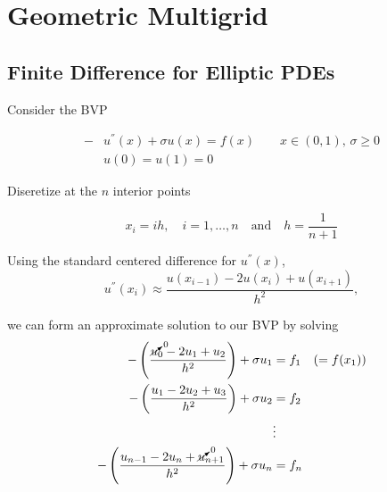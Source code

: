 \section{Geometric Multigrid}

\subsection{Finite Difference for Elliptic PDEs}

Consider the BVP

\begin{align*}
-&u^{''}(x) + \sigma u(x) = f(x) \qquad x\in (0,1),\, \sigma \geq 0 \\
 &u(0)=u(1)=0
\end{align*}

Diseretize at the $n$ interior points

\begin{equation*}
x_i = ih, \quad i=1, \ldots, n \quad \text{and} \quad h = \frac{1}{n+1}
\end{equation*}

Using the standard centered difference for $u^{''}(x)$,
\begin{equation*}
u^{''}(x_i) \approx \frac{u(x_{i-1}) - 2 u(x_i) + u(x_{i+1})}{h^2},
\end{equation*}

we can form an approximate solution to our BVP by solving
\begin{align*}
  -\left( \frac{\cancelto{0}{u}_0-2u_1+u_2}{h^2} \right) + \sigma u_1           &= f_1 \quad (=f(x_1)) \\
  -\left( \frac{u_1-2u_2+u_3}{h^2} \right) + \sigma u_2                         &= f_2 \\
                                                                               &\vdots\\
  -\left( \frac{u_{n-1}-2u_n + \cancelto{0}{u}_{n+1}}{h^2} \right) + \sigma u_n  &= f_n \\
\end{align*}

